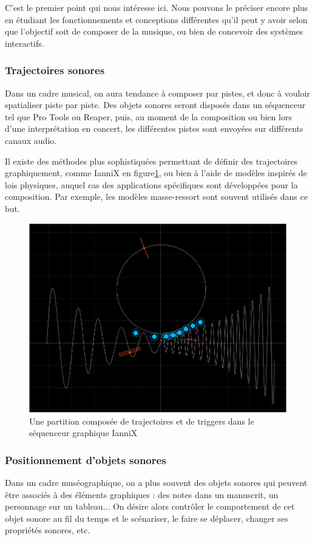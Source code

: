 \documentclass[french]{article}
\begin{document}
C'est le premier point qui nous intéresse ici. Nous pouvons le préciser encore plus en étudiant les fonctionnements et conceptions différentes qu'il peut y avoir selon que l'objectif soit de composer de la musique, ou bien de concevoir des systèmes interactifs.

\subsubsection{Trajectoires sonores}
Dans un cadre musical, on aura tendance à composer par pistes, et donc à vouloir spatialiser piste par piste. Des objets sonores seront disposés dans un séquenceur tel que Pro Tools ou Reaper, puis, au moment de la composition ou bien lors d'une interprétation en concert, les différentes pistes sont envoyées sur différents canaux audio.

Il existe des méthodes plus sophistiquées permettant de définir des trajectoires graphiquement, comme IanniX en figure\ref{fig.iannix}, ou bien à l'aide de modèles inspirés de lois physiques, auquel cas des applications spécifiques sont développées pour la composition. Par exemple, les modèles masse-ressort sont souvent utilisés dans ce but.

\begin{figure}[h]
\centering
\includegraphics[scale=0.3]{images/iannix.png}
\caption{Une partition composée de trajectoires et de triggers dans le séquenceur graphique IanniX}
\label{fig.iannix}
\end{figure}

\subsubsection{Positionnement d'objets sonores}
Dans un cadre muséographique, on a plus souvent des objets sonores qui peuvent être associés à des éléments graphiques : des notes dans un manuscrit, un personnage sur un tableau... On désire alors contrôler le comportement de cet objet sonore au fil du temps et le scénariser, le faire se déplacer, changer ses propriétés sonores, etc.
\end{document}
